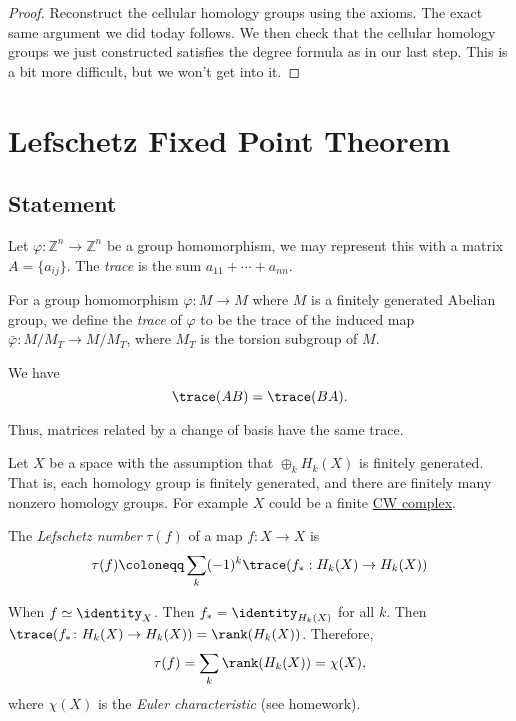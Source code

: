 \begin{proof}
	Reconstruct the cellular homology groups using the axioms. The exact same argument we did today follows. We then check that the cellular homology groups we just constructed satisfies the degree formula as in our last step. This is a bit more difficult, but we won't get into it.
\end{proof}

\section{Lefschetz Fixed Point Theorem}
\subsection{Statement}
\begin{definition}\label{def:trace-group-homomorphism}
	Let $\varphi : \mathbb{Z}^n \to \mathbb{Z}^n$ be a group homomorphism, we may represent this with a matrix
	$A = \{a_{ij}\}$. The \emph{trace} is the sum $a_{11} + \cdots + a_{nn}$.

	For a group homomorphism $\varphi : M \to M$ where $M$ is a finitely generated Abelian group, we define the \emph{trace} of $\varphi$
	to be the trace of the induced map $\bar{\varphi} : M/M_T \to M/M_T$, where $M_T$ is the torsion subgroup of $M$.
\end{definition}

\begin{exercise}
	We have
	\[
		\trace(AB) = \trace(BA).
	\]

	Thus, matrices related by a change of basis have the same trace.
\end{exercise}

\begin{definition}\label{def:lefschetz-number}
	Let \(X\) be a space with the assumption that \(\oplus_k H_k(X)\) is finitely generated. That is, each homology group is finitely
	generated, and there are finitely many nonzero homology groups. For example $X$ could be a finite \hyperref[def:CW-Complex]{CW complex}.

	The \emph{Lefschetz number} \(\tau(f)\) of a map \(f \colon X \to X\) is
	\[
		\tau(f) \coloneqq \sum_k (-1)^k \trace(f_\ast : H_k(X) \to H_k(X))
	\]
\end{definition}

\begin{eg}
	When $f \simeq \identity _X$. Then $f_\ast = \identity_{H_k(X)}$ for all $k$. Then $\trace(f_\ast \colon H_k(X) \to H_k(X)) = \rank(H_k(X))$. Therefore,
	\[
		\tau(f) = \sum_k \rank(H_k(X)) = \chi(X),
	\]
	where \(\chi(X)\) is the \emph{Euler characteristic} (see homework).
\end{eg}

